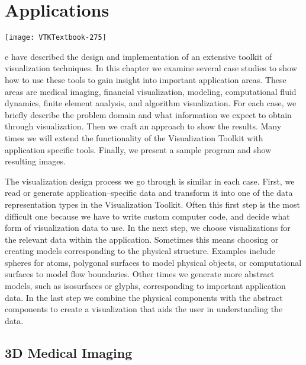 \chapter[Applications]{Applications}
\label{chap:applications}

\vspace{-7\baselineskip} %
\hfill
 \begin{minipage}{0.5\textwidth}
 \centering
 \texttt{[image: VTKTextbook-275]}
 \end{minipage}
\vspace{2\baselineskip}

e have described the design and implementation of an extensive toolkit of visualization techniques.
In this chapter we examine several case studies to show how to use these tools to gain insight into important application areas.
These areas are medical imaging, financial visualization, modeling, computational fluid dynamics, finite element analysis, and algorithm visualization. For each case, we briefly describe the problem domain and what information we expect to obtain through visualization.
Then we craft an approach to show the results.
Many times we will extend the functionality of the Visualization Toolkit with application specific tools.
Finally, we present a sample program and show resulting images.

The visualization design process we go through is similar in each case.
First, we read or generate application--specific data and transform it into one of the data representation types in the Visualization Toolkit.
Often this first step is the most difficult one because we have to write custom computer code, and decide what form of visualization data to use.
In the next step, we choose visualizations for the relevant data within the application.
Sometimes this means choosing or creating models corresponding to the physical structure. Examples include spheres for atoms, polygonal surfaces to model physical objects, or computational surfaces to model flow boundaries.
Other times we generate more abstract models, such as isosurfaces or glyphs, corresponding to important application data.
In the last step we combine the physical components with the abstract components to create a visualization that aids the user in understanding the data.

\section{3D Medical Imaging}

